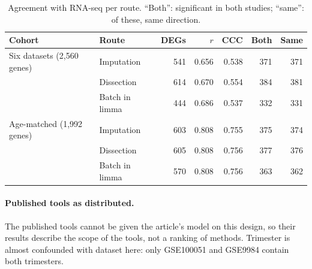 \documentclass[11pt,a4paper]{article}
\begin{document}
\begin{table}[htbp]
\centering
\caption{Agreement with RNA-seq per route. ``Both'': significant
  in both studies; ``same'': of these, same direction.}
\label{tab:supp-routes-rnaseq}
\begin{tabular}{llrrrrr}
\toprule
Cohort & Route & DEGs & $r$ & CCC & Both & Same \\
\midrule
Six datasets (2{,}560 genes) & Imputation      & 541 & 0.656 & 0.538 & 371 & 371 \\
                             & Dissection      & 614 & 0.670 & 0.554 & 384 & 381 \\
                             & Batch in limma  & 444 & 0.686 & 0.537 & 332 & 331 \\
\addlinespace
Age-matched (1{,}992 genes)  & Imputation      & 603 & 0.808 & 0.755 & 375 & 374 \\
                             & Dissection      & 605 & 0.808 & 0.756 & 377 & 376 \\
                             & Batch in limma  & 570 & 0.808 & 0.756 & 363 & 362 \\
\bottomrule
\end{tabular}
\end{table}

\paragraph{Published tools as distributed.}
The published tools cannot be given the article's model on this
design, so their results describe the scope of the tools, not a
ranking of methods. Trimester is almost confounded with dataset
here: only GSE100051 and GSE9984 contain both trimesters.
\end{document}
